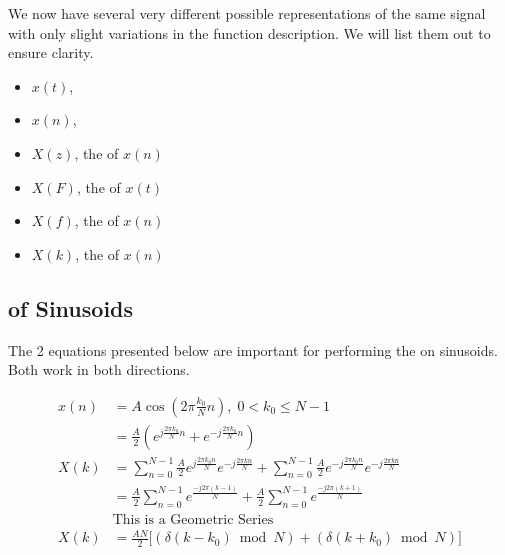 \begin{remark*}
  We now have several very different possible representations of the same signal with only slight variations in the function description.
  We will list them out to ensure clarity.
  \begin{itemize}[noitemsep]
  \item $x(t)$, 
  \item $x(n)$, 
  \item $X(z)$, the  of $x(n)$
  \item $X(F)$, the  of $x(t)$
  \item $X(f)$, the  of $x(n)$
  \item $X(k)$, the  of $x(n)$
  \end{itemize}
\end{remark*}

\subsection{ of Sinusoids}\label{subsec:DFT_of_Sinusoids}
The 2 equations presented below are important for performing the  on sinusoids.
Both  work in both directions.

\begin{equation}\label{eq:DFT_of_Cosine}
  \begin{aligned}
    x(n) &= A \cos \left( 2\pi \frac{k_{0}}{N} n \right),\; 0 < k_{0} \leq N-1 \\
    &= \frac{A}{2} \left( e^{j \frac{2\pi k_{0}}{N} n} + e^{-j \frac{2\pi k_{0}}{N} n} \right) \\
    X(k) &= \sum\limits_{n=0}^{N-1} \frac{A}{2} e^{j \frac{2\pi k_{0} n}{N}} e^{-j \frac{2\pi k n}{N}} + \sum\limits_{n=0}^{N-1} \frac{A}{2} e^{-j \frac{2\pi k_{0} n}{N}} e^{-j \frac{2\pi k n}{N}} \\
    &= \frac{A}{2} \sum\limits_{n=0}^{N-1} e^{\frac{-j 2\pi (k-1)}{N}} + \frac{A}{2} \sum\limits_{n=0}^{N-1} e^{\frac{-j 2\pi (k+1)}{N}} \\
    &\text{This is a Geometric Series} \\
    X(k) &= \frac{AN}{2} \biggl[ (\delta(k-k_{0}) \bmod N) + (\delta(k+k_{0}) \bmod N) \biggr]
  \end{aligned}
\end{equation}

